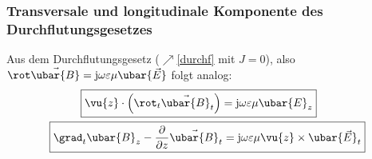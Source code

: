 \subsubsection{Transversale und longitudinale Komponente des Durchflutungsgesetzes}
	 Aus dem Durchflutungsgesetz ($\nearrow$\ref{durchf} mit $J=0$), also \(\rot \vec{\ubar{B}} = \mathrm{j}\omega\varepsilon\mu\ubar{\vec{E}}\) folgt analog:
	\begin{align}
		\Aboxed{\vu{z} \cdot \left(\rot _t \vec{\ubar{B}}_t\right) &= \mathrm{j}\omega\varepsilon\mu\ubar{E}_z} \label{longdurchf} \\
		 \Aboxed{\grad _t \ubar{B}_{z} - \frac{\partial}{\partial z}\vec{\ubar{B}}_t& = \mathrm{j}\omega\varepsilon\mu \vu{z}\times \ubar{\vec{E}}_t} \label{transdurchf}
	\end{align}

